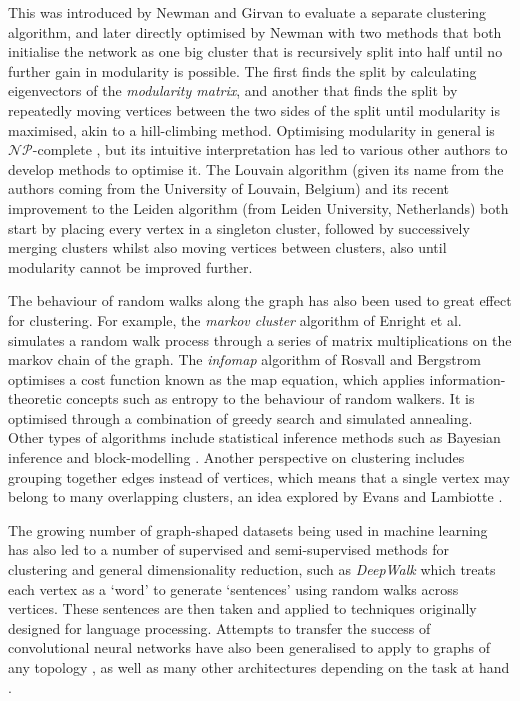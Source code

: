 This was introduced by Newman and Girvan \cite{Newman2004} to evaluate a separate clustering algorithm, and later directly optimised by Newman \cite{Newman2006} with two methods that both initialise the network as one big cluster that is recursively split into half until no further gain in modularity is possible. The first finds the split by calculating eigenvectors of the \emph{modularity matrix}, and another that finds the split by repeatedly moving vertices between the two sides of the split until modularity is maximised, akin to a hill-climbing method.
Optimising modularity in general is $\mathcal{NP}$-complete \cite{Brandes2007a}, but its intuitive interpretation has led to various other authors to develop methods to optimise it. The Louvain algorithm (given its name from the authors coming from the University of Louvain, Belgium) \cite{Blondel2008} and its recent improvement to the Leiden algorithm (from Leiden University, Netherlands) \cite{Traag2019} both start by placing every vertex in a singleton cluster, followed by successively merging clusters whilst also moving vertices between clusters, also until modularity cannot be improved further.

The behaviour of random walks along the graph has also been used to great effect for clustering. For example, the \emph{markov cluster} algorithm of Enright et al.\ \cite{Enright2002} simulates a random walk process through a series of matrix multiplications on the markov chain of the graph.
The \emph{infomap} algorithm of Rosvall and Bergstrom \cite{Rosvall2008} optimises a cost function known as the map equation, which applies information-theoretic concepts such as entropy to the behaviour of random walkers. It is optimised through a combination of greedy search and simulated annealing.
Other types of algorithms include statistical inference methods such as Bayesian inference \cite{Hastings2006} and block-modelling \cite{Reichardt2007}.
Another perspective on clustering includes grouping together edges instead of vertices, which means that a single vertex may belong to many overlapping clusters, an idea explored by Evans and Lambiotte \cite{Evans2009}.

The growing number of graph-shaped datasets being used in machine learning has also led to a number of supervised and semi-supervised methods for clustering and general dimensionality reduction, such as \emph{DeepWalk} \cite{Perozzi2014} which treats each vertex as a `word' to generate `sentences' using random walks across vertices. These sentences are then taken and applied to techniques originally designed for language processing. Attempts to transfer the success of convolutional neural networks have also been generalised to apply to graphs of any topology \cite{Kipf2016, LeCun2017}, as well as many other architectures depending on the task at hand \cite{Battaglia2018, Wu2020}.

